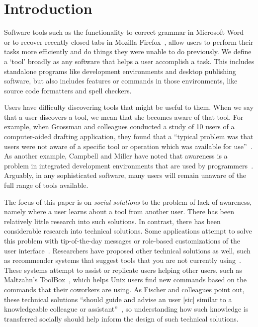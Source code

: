 \documentclass[smallextended]{svjour3}
\begin{document}
\section{Introduction}\label{sec:intro}

\noindent
Software tools such as the functionality to correct grammar in Microsoft
Word~\cite{word} or to recover recently closed tabs in Mozilla Firefox~\cite{firefox}, allow users to 
perform their tasks more efficiently and do things they were unable to do
previously.
We define a `tool' broadly as any software that helps a user accomplish a task.
This includes standalone programs like development environments 
and desktop publishing software,
but also includes features or commands in those environments, 
like source code formatters and spell checkers.

Users have difficulty discovering tools that might be
useful to them.
When we say that a user discovers a tool, we mean that she becomes
aware of that tool.
For example, when Grossman and colleagues conducted a study of 10 users of
a computer-aided drafting application, they found that a ``typical problem was
that users were not aware of a specific tool or operation which was available for
use''~\cite{grossman09}.
As another example, Campbell and Miller have noted that awareness is a problem
in integrated development environments that are used by
programmers~\cite{campbell08}. 
Arguably, in any sophisticated software, many
users will remain unaware of the full range of tools available.

The focus of this paper is on \emph{social solutions} to the problem of lack of
awareness, namely where a user learns about a tool from another user. 
There has been relatively little research into such solutions. 
In contrast, there has been
considerable research into technical solutions.
Some applications attempt to solve this problem with tip-of-the-day messages or
role-based customizations of the user interface~\cite{findlater08}.
Researchers have proposed other technical solutions as well,
such as recommender systems that suggest tools that you are not currently 
using~\cite{linton,maltzahn,matejka09}.
These systems attempt to assist or replicate users helping other users, 
such as Maltzahn's ToolBox~\cite{maltzahn}, which helps Unix users find new commands based on the
commands that their coworkers are using.
As Fischer and colleagues point out, these technical solutions ``should guide
and advise an user [sic] similar to a knowledgeable colleague or
assistant''~\cite[p.~115]{fischer84}, so understanding how such knowledge is
transferred socially should help inform the design of such technical solutions.
\end{document}
